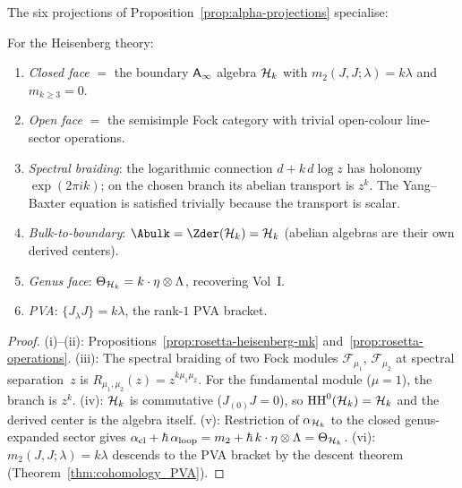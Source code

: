 The six projections of Proposition~\ref{prop:alpha-projections} specialise:

\begin{corollary}
\label{cor:rosetta-heisenberg-projections}
For the Heisenberg theory:
\begin{enumerate}[label=\textup{(\roman*)}]
\item \emph{Closed face} $=$ the boundary $\mathsf{A}_{\infty}$ algebra $\mathcal{H}_k$
 with $m_2(J,J;\lambda) = k\lambda$ and $m_{k \ge 3} = 0$.
\item \emph{Open face} $=$ the semisimple Fock category with
 trivial open-colour line-sector operations.
\item \emph{Spectral braiding}: the logarithmic connection
 $d+k\,d\log z$ has holonomy $\exp(2\pi i k)$; on the chosen
 branch its abelian transport is $z^k$. The Yang--Baxter equation is
 satisfied trivially because the transport is scalar.
\item \emph{Bulk-to-boundary}: $\Abulk = \Zder(\cH_k) = \cH_k$
 \textup{(}abelian algebras are their own derived centers\textup{)}.
\item \emph{Genus face}: $\Theta_{\mathcal{H}_k} = k \cdot \eta \otimes
 \Lambda$, recovering Vol~I\@.
\item \emph{PVA}: $\{J_\lambda J\} = k\lambda$, the rank-$1$ PVA
 bracket.
\end{enumerate}
\end{corollary}

\begin{proof}
(i)--(ii): Propositions~\ref{prop:rosetta-heisenberg-mk}
and~\ref{prop:rosetta-operations}.
(iii): The spectral braiding of two Fock modules $\mathcal{F}_{\mu_1}$,
$\mathcal{F}_{\mu_2}$ at spectral separation~$z$ is
$R_{\mu_1,\mu_2}(z) = z^{k\mu_1\mu_2}$. For the fundamental
module ($\mu = 1$), the branch is $z^k$.
(iv): $\mathcal{H}_k$ is commutative ($J_{(0)}J = 0$), so
$\operatorname{HH}^0(\mathcal{H}_k) = \mathcal{H}_k$ and the derived center is the algebra
itself.
(v): Restriction of $\alpha_{\mathcal{H}_k}$ to the closed genus-expanded
sector gives $\alpha_{\mathrm{cl}} + \hbar\,\alpha_{\mathrm{loop}}
= m_2 + \hbar\,k\cdot\eta\otimes\Lambda = \Theta_{\mathcal{H}_k}$.
(vi): $m_2(J,J;\lambda) = k\lambda$ descends to the PVA bracket
by the descent theorem
(Theorem~\ref{thm:cohomology_PVA}).
\end{proof}

